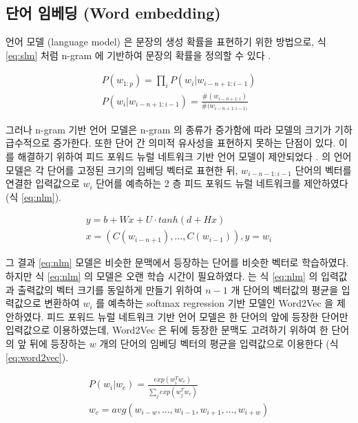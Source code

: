 \documentclass[11pt]{article}
\begin{document}
\subsection{단어 임베딩 (Word embedding)}

언어 모델 (language model) 은 문장의 생성 확률을 표현하기 위한 방법으로, 식 \ref{eq:slm} 처럼 n-gram 에 기반하여 문장의 확률을 정의할 수 있다 \citep{jurafsky2014speech}.

\begin{equation}
  \label{eq:slm}
  \begin{aligned}
  P(w_{1:p}) = \prod_i P(w_i \vert w_{i-n+1:i-1}) \\
  P(w_i \vert w_{i-n+1:i-1}) = \frac{\#(w_{i-n+1:i})}{\#(w_{i-n+1:i-1)}}
  \end{aligned}
\end{equation}

그러나 n-gram 기반 언어 모델은 n-gram 의 종류가 증가함에 따라 모델의 크기가 기하급수적으로 증가한다.
또한 단어 간 의미적 유사성을 표현하지 못하는 단점이 있다.
이를 해결하기 위하여 피드 포워드 뉴럴 네트워크 기반 언어 모델이 제안되었다 \citep{bengio2003neural}.
\citep{bengio2003neural} 의 언어 모델은 각 단어를 고정된 크기의 임베딩 벡터로 표현한 뒤, $w_{i-n-1:i-1}$ 단어의 벡터를 연결한 입력값으로 $w_i$ 단어를 예측하는 2 층 피드 포워드 뉴럴 네트워크를 제안하였다 (식 \ref{eq:nlm}).

\begin{equation}
  \label{eq:nlm}
  \begin{aligned}
  y = b + Wx + U \cdot tanh(d + Hx) \\
  x = (C(w_{i-n+1}), \dots, C(w_{i-1})), y = w_i
  \end{aligned}
\end{equation}

그 결과 \ref{eq:nlm} 모델은 비슷한 문맥에서 등장하는 단어를 비슷한 벡터로 학습하였다.
하지만 식 \ref{eq:nlm} 의 모델은 오랜 학습 시간이 필요하였다.
\citep{mikolov2013efficient} 는 식 \ref{eq:nlm} 의 입력값과 출력값의 벡터 크기를 동일하게 만들기 위하여 $n-1$ 개 단어의 벡터값의 평균을 입력값으로 변환하여 $w_i$ 를 예측하는 softmax regression 기반 모델인 Word2Vec 을 제안하였다.
피드 포워드 뉴럴 네트워크 기반 언어 모델은 한 단어의 앞에 등장한 단어만 입력값으로 이용하였는데, Word2Vec 은 뒤에 등장한 문맥도 고려하기 위하여 한 단어의 앞 뒤에 등장하는 $w$ 개의 단어의 임베딩 벡터의 평균을 입력값으로 이용한다 (식 \ref{eq:word2vec}).

\begin{equation}
  \label{eq:word2vec}
  \begin{aligned}
  P(w_i \vert w_c) = \frac{exp(w_i^T w_c)}{\sum_j exp(w_j^T w_c)} \\
  w_c = avg(w_{i-w}, \dots, w_{i-1}, w_{i+1}, \dots, w_{i+w})
  \end{aligned}
\end{equation}
\end{document}
